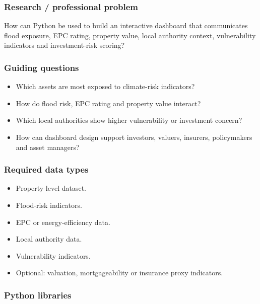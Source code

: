 \documentclass[
  a4paper,
]{article}
\providecommand{\tightlist}{%
  \setlength{\itemsep}{0pt}\setlength{\parskip}{0pt}}
\begin{document}
\subsubsection{Research / professional
problem}\label{research-professional-problem-1}

How can Python be used to build an interactive dashboard that
communicates flood exposure, EPC rating, property value, local authority
context, vulnerability indicators and investment-risk scoring?

\subsubsection{Guiding questions}\label{guiding-questions-1}

\begin{itemize}
\tightlist
\item
  Which assets are most exposed to climate-risk indicators?
\item
  How do flood risk, EPC rating and property value interact?
\item
  Which local authorities show higher vulnerability or investment
  concern?
\item
  How can dashboard design support investors, valuers, insurers,
  policymakers and asset managers?
\end{itemize}

\subsubsection{Required data types}\label{required-data-types-1}

\begin{itemize}
\tightlist
\item
  Property-level dataset.
\item
  Flood-risk indicators.
\item
  EPC or energy-efficiency data.
\item
  Local authority data.
\item
  Vulnerability indicators.
\item
  Optional: valuation, mortgageability or insurance proxy indicators.
\end{itemize}

\subsubsection{Python libraries}\label{python-libraries-1}
\end{document}
